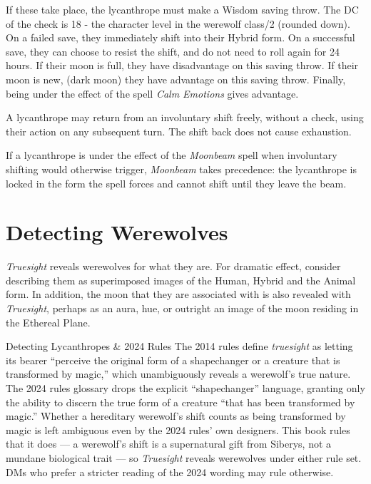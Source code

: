 \documentclass[twocolumn]{dndbook}
\begin{document}
If these take place, the lycanthrope must make a Wisdom saving throw.
The DC of the check is 18 - the character level in the werewolf class/2 (rounded down).
On a failed save, they immediately shift into their Hybrid form.
On a successful save, they can choose to resist the shift, and do not need to roll again for 24 hours.
If their moon is full, they have disadvantage on this saving throw.
If their moon is new, (dark moon) they have advantage on this saving throw.
Finally, being under the effect of the spell \emph{Calm Emotions} gives advantage.

A lycanthrope may return from an involuntary shift freely, without a check, using their action on any subsequent turn.
The shift back does not cause exhaustion.

If a lycanthrope is under the effect of the \emph{Moonbeam} spell when involuntary shifting would otherwise trigger, \emph{Moonbeam} takes precedence: the lycanthrope is locked in the form the spell forces and cannot shift until they leave the beam.

\section*{Detecting Werewolves}\label{sec:detecting-werewolves}

\emph{Truesight} reveals werewolves for what they are.
For dramatic effect, consider describing them as superimposed images of the Human, Hybrid and the Animal form.
In addition, the moon that they are associated with is also revealed with \emph{Truesight},
perhaps as an aura, hue, or outright an image of the moon residing in the Ethereal Plane.\par

\begin{DndSidebar}[float=!b]{Detecting Lycanthropes \& 2024 Rules}
    The 2014 rules define \emph{truesight} as letting its bearer ``perceive the original form of a shapechanger or a creature that is transformed by magic,'' which unambiguously reveals a werewolf's true nature.
    The 2024 rules glossary drops the explicit ``shapechanger'' language, granting only the ability to discern the true form of a creature ``that has been transformed by magic.''
    Whether a hereditary werewolf's shift counts as being transformed by magic is left ambiguous even by the 2024 rules' own designers.
    This book rules that it does --- a werewolf's shift is a supernatural gift from Siberys, not a mundane biological trait --- so \emph{Truesight} reveals werewolves under either rule set.
    DMs who prefer a stricter reading of the 2024 wording may rule otherwise.
\end{DndSidebar}
\end{document}
